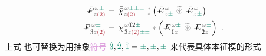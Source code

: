 \begin{subequations} \label{eq:DP^(2)-pm_pmpm}
\begin{align}
	\Xint{\mathcolor{gray}{-}}{30}{\bar{P}}^{\;\! \mathcolor{gray}{\omega} \textcolor{PineGreen}{\pm}}_{\;\! \mathcolor{gray}{z} \textcolor{Maroon}{(2)}} &= \Xint{{}^{}_{\mathcolor{gray}{-}}}{23}{\bar{\bar{\bar{\chi}}}}^{\;\! \mathcolor{gray}{\omega} \textcolor{PineGreen}{\pm \pm \pm}}_{\mathcolor{gray}{z} \textcolor{Maroon}{(2)}} ~{}^{\mathcolor{gray}{*}}_{\mathcolor{gray}{*}} \left( \Xint{\mathcolor{gray}{-}}{295}{\bar{E}}^{\;\!\mathcolor{gray}{\omega}}_{\;\! \mathcolor{gray}{z} \textcolor{PineGreen}{\pm} } ~\mathcolor{gray}{\widetilde \circledast}~ \Xint{\mathcolor{gray}{-}}{295}{\bar{E}}^{\;\!\mathcolor{gray}{\omega}}_{\;\! \mathcolor{gray}{z} \textcolor{PineGreen}{\pm} } \right) \label{eq:vec-DP^(2)-pm_pmpm} \\
	\Xint{\mathcolor{gray}{-}}{30}{P}^{\;\! \mathcolor{gray}{\omega} \textcolor{PineGreen}{\pm}}_{\;\! \hat{3}\mathcolor{gray}{z} \textcolor{Maroon}{(2)}} &= \Xint{{}^{}_{\mathcolor{gray}{-}}}{23}{\chi}^{\;\! \mathcolor{gray}{\omega} \hat{1} \hat{2} \textcolor{PineGreen}{\pm}}_{\;\! \hat{3} \mathcolor{gray}{z} \textcolor{Maroon}{(2)} \textcolor{PineGreen}{\pm \pm}} \mathcolor{gray}{*} \left( \Xint{\mathcolor{gray}{-}}{295}{E}^{\;\!\mathcolor{gray}{\omega} \textcolor{PineGreen}{\pm}}_{\;\! \hat{1} \mathcolor{gray}{z}} ~\mathcolor{gray}{\widetilde \circledast}~ \Xint{\mathcolor{gray}{-}}{295}{E}^{\;\!\mathcolor{gray}{\omega} \textcolor{PineGreen}{\pm}}_{\;\! \hat{2} \mathcolor{gray}{z}} \right) ~. \label{eq:components-DP^(2)-pm_pmpm}
\end{align}
\end{subequations}
上式  也可替换为用抽象\textcolor{Plum}{符号} $\textcolor{PineGreen}{\hat{3}},\textcolor{PineGreen}{\hat{2}},\textcolor{PineGreen}{\hat{1}} = \textcolor{PineGreen}{\pm},\textcolor{PineGreen}{\pm},\textcolor{PineGreen}{\pm}$ 来代表具体\textcolor{PineGreen}{本征模}的形式
